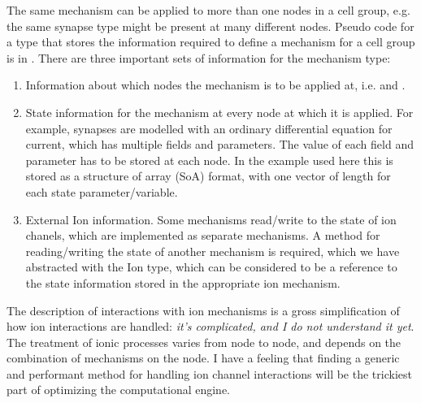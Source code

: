 The same mechanism can be applied to more than one nodes in a cell group, e.g. the same synapse type might be present at many different nodes. Pseudo code for a type that stores the information required to define a mechanism for a cell group is in .  There are three important sets of information for the mechanism type:
\begin{enumerate}
    \item
        Information about which nodes the mechanism is to be applied at, i.e.  and .
    \item
        State information for the mechanism at every node at which it is applied. For example, synapses are modelled with an ordinary differential equation for current, which has multiple fields and parameters. The value of each field and parameter has to be stored at each node. In the example used here this is stored as a structure of array (SoA) format, with one vector of length  for each state parameter/variable.
    \item
        External Ion information.
        Some mechanisms read/write to the state of ion chanels, which are implemented as separate mechanisms.
        A method for reading/writing the state of another mechanism is required, which we have abstracted with the Ion type, which can be considered to be a reference to the state information stored in the appropriate ion mechanism.
\end{enumerate}

\begin{note}
The description of interactions with ion mechanisms is a gross simplification of how ion interactions are handled: \emph{it's complicated, and I do not understand it yet}.
The treatment of ionic processes varies from node to node, and depends on the combination of mechanisms on the node.
I have a feeling that finding a generic and performant method for handling ion channel interactions will be the trickiest part of optimizing the computational engine.
\end{note}

